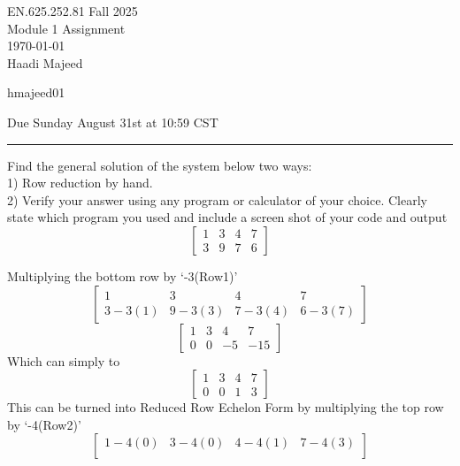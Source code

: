 \documentclass[12pt,letterpaper, onecolumn]{exam}
\begin{document}
\begingroup  
    \centering
    \LARGE EN.625.252.81 Fall 2025\\
    \LARGE Module 1 Assignment\\[0.5em]
    \large \today\\[0.5em]
    \large Haadi Majeed\par
    \large hmajeed01\par
    \large Due Sunday August 31st at 10:59 CST\par
\endgroup
\rule{\textwidth}{0.4pt}
\printanswers
\renewcommand{\solutiontitle}{\noindent\textbf{Ans:}\enspace}

\begin{questions}

    \question Find the general solution of the system below two ways:\\
        1) Row reduction by hand.\\
        2) Verify your answer using any program or calculator of your choice. Clearly state which program you used and include a screen shot of your code and output\\
        $$
        \begin{bmatrix}
            1 & 3 & 4 & 7\\
            3 & 9 & 7 & 6
        \end{bmatrix}
        $$
        \begin{solution}
            Multiplying the bottom row by `-3(Row1)'
            $$
            \begin{bmatrix}
                1 & 3 & 4 & 7\\
                3 - 3(1) & 9 - 3(3) & 7 - 3(4) & 6 - 3(7)
            \end{bmatrix}
            $$
            $$
            \begin{bmatrix}
                1 & 3 & 4 & 7\\
                0 & 0 & -5 & -15
            \end{bmatrix}
            $$
            Which can simply to
            $$
            \begin{bmatrix}
                1 & 3 & 4 & 7\\
                0 & 0 & 1 & 3
            \end{bmatrix}
            $$
            This can be turned into Reduced Row Echelon Form by multiplying the top row by `-4(Row2)'
            $$
            \begin{bmatrix}
                1 - 4(0) & 3 - 4(0) & 4 - 4(1) & 7 - 4(3)\\

\end{bmatrix}$$
\end{solution}
\end{questions}
\end{document}
